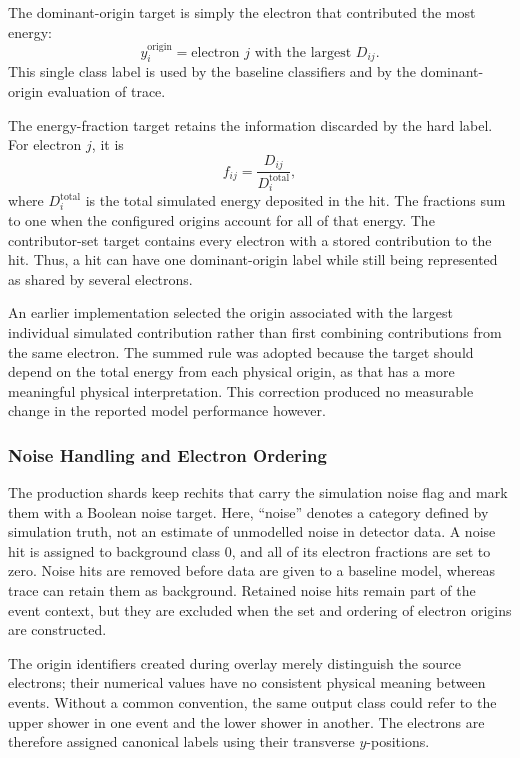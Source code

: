The dominant-origin target is simply the electron that contributed the most
energy:
\begin{equation}
    y_i^{\mathrm{origin}}
    = \text{electron \(j\) with the largest \(D_{ij}\)}.
    \label{eq:dominant_origin_target}
\end{equation}
This single class label is used by the baseline classifiers and by the
dominant-origin evaluation of \gls{trace}.

The energy-fraction target retains the information discarded by the hard
label. For electron \(j\), it is
\begin{equation}
    f_{ij}
    =
    \frac{D_{ij}}{D_i^{\mathrm{total}}},
    \label{eq:origin_fraction_target}
\end{equation}
where \(D_i^{\mathrm{total}}\) is the total simulated energy deposited in the
hit. The fractions sum to one when the configured origins account for all of
that energy. The contributor-set target contains every electron with a stored
contribution to the hit. Thus, a hit can have one dominant-origin label while
still being represented as shared by several electrons.

An earlier implementation selected the origin associated with the largest
individual simulated contribution rather than first combining contributions
from the same electron. The summed rule was adopted because the target should
depend on the total energy from each physical origin, as that has a more meaningful physical interpretation. This correction produced
no measurable change in the reported model performance however.

\subsubsection{Noise Handling and Electron Ordering}

The production shards keep \gls{rechit}s that carry the simulation noise flag
and mark them with a Boolean noise target. Here, ``noise'' denotes a category
defined by simulation truth, not an estimate of unmodelled noise in detector
data. A noise hit is assigned to background class \(0\), and all of its
electron fractions are set to zero. Noise hits are removed before data are
given to a baseline model, whereas \gls{trace} can retain them as background.
Retained noise hits remain part of the event context, but they are excluded
when the set and ordering of electron origins are constructed.

The origin identifiers created during overlay merely distinguish the source
electrons; their numerical values have no consistent physical meaning between
events. Without a common convention, the same output class could refer to the
upper shower in one event and the lower shower in another. The electrons are
therefore assigned canonical labels using their transverse \(y\)-positions.

